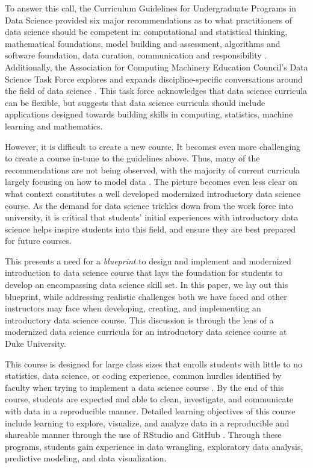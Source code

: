 \documentclass[
  12pt]{article}
\begin{document}
To answer this call, the Curriculum Guidelines for Undergraduate
Programs in Data Science provided six major recommendations as to what
practitioners of data science should be competent in: computational and
statistical thinking, mathematical foundations, model building and
assessment, algorithms and software foundation, data curation,
communication and responsibility \citep{veaux_2017}. Additionally, the
Association for Computing Machinery Education Council's Data Science
Task Force explores and expands discipline-specific conversations around
the field of data science \citep{Danyluk_2021}. This task force
acknowledges that data science curricula can be flexible, but suggests
that data science curricula should include applications designed towards
building skills in computing, statistics, machine learning and
mathematics.

However, it is difficult to create a new course. It becomes even more
challenging to create a course in-tune to the guidelines above. Thus,
many of the recommendations are not being observed, with the majority of
current curricula largely focusing on how to model data
\citep{Donoho2017}. The picture becomes even less clear on what context
constitutes a well developed modernized introductory data science
course. As the demand for data science trickles down from the work force
into university, it is critical that students' initial experiences with
introductory data science helps inspire students into this field, and
ensure they are best prepared for future courses.

This presents a need for a \emph{blueprint} to design and implement and
modernized introduction to data science course that lays the foundation
for students to develop an encompassing data science skill set. In this
paper, we lay out this blueprint, while addressing realistic challenges
both we have faced and other instructors may face when developing,
creating, and implementing an introductory data science course. This
discussion is through the lens of a modernized data science curricula
for an introductory data science course at Duke University.

This course is designed for large class sizes that enrolls students with
little to no statistics, data science, or coding experience, common
hurdles identified by faculty when trying to implement a data science
course \citep{Schwab2020}. By the end of this course, students are
expected and able to clean, investigate, and communicate with data in a
reproducible manner. Detailed learning objectives of this course include
learning to explore, visualize, and analyze data in a reproducible and
shareable manner through the use of RStudio and GitHub
\citep{R21, github}. Through these programs, students gain experience in
data wrangling, exploratory data analysis, predictive modeling, and data
visualization.
\end{document}

